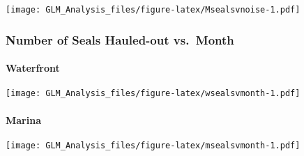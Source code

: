 \documentclass[
]{article}
\begin{document}
\texttt{[image: GLM\_Analysis\_files/figure-latex/Msealsvnoise-1.pdf]}

\hypertarget{number-of-seals-hauled-out-vs.-month}{%
\subsubsection{Number of Seals Hauled-out
vs.~Month}\label{number-of-seals-hauled-out-vs.-month}}

\hypertarget{waterfront-1}{%
\paragraph{Waterfront}\label{waterfront-1}}

\texttt{[image: GLM\_Analysis\_files/figure-latex/wsealsvmonth-1.pdf]}

\hypertarget{marina-1}{%
\paragraph{Marina}\label{marina-1}}

\texttt{[image: GLM\_Analysis\_files/figure-latex/msealsvmonth-1.pdf]}
\end{document}
